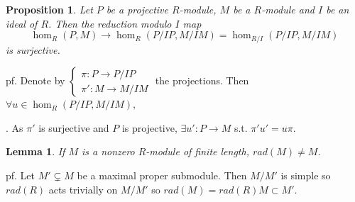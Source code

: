 \documentclass[12pt,letterpaper]{report}
\newtheorem{lemma}{Lemma}[section]
\newtheorem{proposition}{Proposition}[section]
\begin{document}
\begin{proposition}Let $P$ be a projective $R$-module, $M$ be a $R$-module and $I$ be an ideal of $R$. Then the reduction modulo $I$ map\begin{equation*}\hom_{R}(P,M)\rightarrow\hom_{R}(P/IP,M/IM)=\hom_{R/I}(P/IP,M/IM)\end{equation*}is surjective.\end{proposition}
pf. Denote by $\left\{\begin{array}{r}\pi:P\rightarrow P/IP\\\pi':M\rightarrow M/IM\end{array}\right.$ the projections. Then $\forall u\in \hom_{R}(P/IP,M/IM),$ . As $\pi'$ is surjective and $P$ is projective, $\exists u':P\rightarrow M$ s.t. $\pi'u'=u\pi$. 

\begin{lemma}If $M$ is a nonzero $R$-module of finite length, $rad(M)\neq M$.\end{lemma}
pf. Let $M'\subsetneq M$ be a maximal proper submodule. Then $M/M'$ is simple so $rad(R)$ acts trivially on $M/M'$ so $rad(M)=rad(R)M\subset M'$. 
\end{document}
